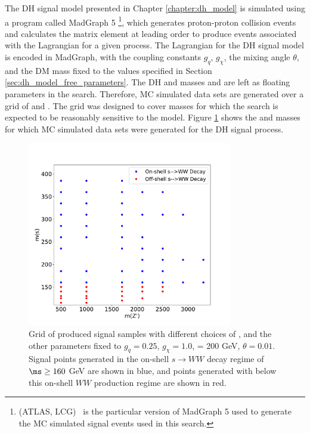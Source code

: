 The DH signal model presented in Chapter \ref{chapter:dh_model} is simulated using a program called MadGraph 5 \cite{MG5}\footnote{\MGNLO[2.7.2](ATLAS, LCG)~\cite{Alwall:2014hca} is the particular version of MadGraph 5 used to generate the MC simulated signal events used in this search.}, which generates proton-proton collision events and calculates the matrix element at leading order to produce events associated with the Lagrangian for a given process. The Lagrangian for the DH signal model is encoded in MadGraph, with the coupling constants \(g_q\), \(g_\chi\), the mixing angle \(\theta\), and the DM mass \mchi fixed to the values specified in Section \ref{sec:dh_model_free_parameters}. The DH and \Zprime masses \ms and \mZp are left as floating parameters in the search. Therefore, MC simulated data sets are generated over a grid of \ms and \mZp. The grid was designed to cover masses for which the search is expected to be reasonably sensitive to the model. Figure \ref{fig:signalgrid} shows the \ms and \mZp masses for which MC simulated data sets were generated for the DH signal process. 

\begin{figure}[h]
	\centering
	\includegraphics[width=0.8\textwidth]{Figures/4/Grid.pdf}
	\caption{Grid of produced signal samples with different choices of \mZp, \ms and the other parameters fixed to \(g_{q}=0.25\), \(g_{\chi} = 1.0\), \mchi = 200 GeV, \(\theta = 0.01\). Signal points generated in the on-shell \(s\rightarrow WW\) decay regime of \(\ms \geq 160\) GeV are shown in blue, and points generated with \ms below this on-shell \(WW\) production regime are shown in red.}
	\label{fig:signalgrid}
\end{figure}

